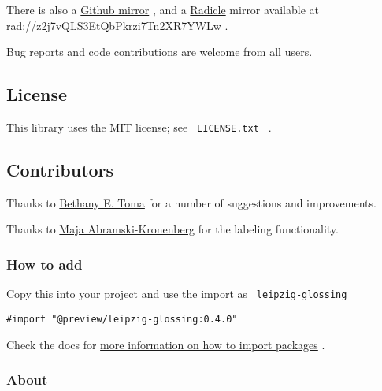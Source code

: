 There is also a
\href{https://github.com/neunenak/typst-leipzig-glossing/}{Github
mirror} , and a \href{https://radicle.xyz/}{Radicle} mirror available at
{rad://z2j7vQLS3EtQbPkrzi7Tn2XR7YWLw} .

Bug reports and code contributions are welcome from all users.

\subsection{License}\label{license}

This library uses the MIT license; see \texttt{\ LICENSE.txt\ } .

\subsection{Contributors}\label{contributors}

Thanks to \href{https://github.com/betoma}{Bethany E. Toma} for a number
of suggestions and improvements.

Thanks to \href{https://github.com/rwmpelstilzchen}{Maja
Abramski-Kronenberg} for the labeling functionality.

\subsubsection{How to add}\label{how-to-add}

Copy this into your project and use the import as
\texttt{\ leipzig-glossing\ }

\begin{verbatim}
#import "@preview/leipzig-glossing:0.4.0"
\end{verbatim}



Check the docs for
\href{https://typst.app/docs/reference/scripting/\#packages}{more
information on how to import packages} .

\subsubsection{About}\label{about}

